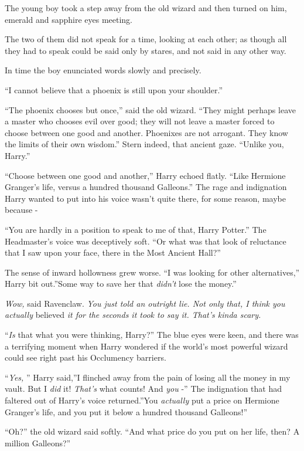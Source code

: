 The young boy took a step away from the old wizard and then turned on
him, emerald and sapphire eyes meeting.

The two of them did not speak for a time, looking at each other; as
though all they had to speak could be said only by stares, and not said
in any other way.

In time the boy enunciated words slowly and precisely.

``I cannot believe that a phoenix is still upon your shoulder.''

``The phoenix chooses but once,'' said the old wizard. ``They might
perhaps leave a master who chooses evil over good; they will not leave a
master forced to choose between one good and another. Phoenixes are not
arrogant. They know the limits of their own wisdom.'' Stern indeed, that
ancient gaze. ``Unlike you, Harry.''

``Choose between one good and another,'' Harry echoed flatly. ``Like
Hermione Granger's life, versus a hundred thousand Galleons.'' The rage
and indignation Harry wanted to put into his voice wasn't quite there,
for some reason, maybe because -

``You are hardly in a position to speak to me of that, Harry Potter.''
The Headmaster's voice was deceptively soft. ``Or what was that look of
reluctance that I saw upon your face, there in the Most Ancient Hall?''

The sense of inward hollowness grew worse. ``I was looking for other
alternatives,'' Harry bit out.''Some way to save her that \emph{didn't}
lose the money.''

\emph{Wow,} said Ravenclaw. \emph{You just told an outright lie. Not
only that, I think you actually} believed \emph{it for the seconds it
took to say it. That's kinda scary.}

``\emph{Is} that what you were thinking, Harry?'' The blue eyes were
keen, and there was a terrifying moment when Harry wondered if the
world's most powerful wizard could see right past his Occlumency
barriers.

``\emph{Yes,} '' Harry said,''I flinched away from the pain of losing all
the money in my vault. But I \emph{did} it! \emph{That's} what counts!
And \emph{you} -'' The indignation that had faltered out of Harry's
voice returned.''You \emph{actually} put a price on Hermione Granger's
life, and you put it below a hundred thousand Galleons!''

``Oh?'' the old wizard said softly. ``And what price do you put on her
life, then? A million Galleons?''

